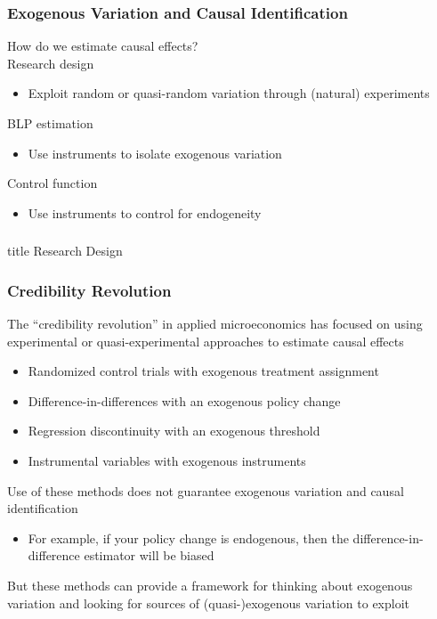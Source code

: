 \documentclass{beamer}
\begin{document}
\begin{frame}\frametitle{Exogenous Variation and Causal Identification}
    How do we estimate causal effects? \\
    \vspace{2ex}
    Research design
    \begin{itemize}
        \item Exploit random or quasi-random variation through (natural) experiments
    \end{itemize}
    \vspace{2ex}
    BLP estimation
    \begin{itemize}
        \item Use instruments to isolate exogenous variation
    \end{itemize}
    \vspace{2ex}
    Control function
    \begin{itemize}
        \item Use instruments to control for endogeneity
    \end{itemize}
\end{frame}

\begin{frame}\frametitle{}
    \vfill
    \centering
    \begin{beamercolorbox}[center]{title}
        \Large Research Design
    \end{beamercolorbox}
    \vfill
\end{frame}

\begin{frame}\frametitle{Credibility Revolution}
    The ``credibility revolution'' in applied microeconomics has focused on using experimental or quasi-experimental approaches to estimate causal effects
    \begin{itemize}
    	\item Randomized control trials with exogenous treatment assignment
    	\item Difference-in-differences with an exogenous policy change
    	\item Regression discontinuity with an exogenous threshold
    	\item Instrumental variables with exogenous instruments
    \end{itemize}
    \vspace{2ex}
    Use of these methods does not guarantee exogenous variation and causal identification
    \begin{itemize}
    	\item For example, if your policy change is endogenous, then the difference-in-difference estimator will be biased
    \end{itemize}
    \vspace{2ex}
    But these methods can provide a framework for thinking about exogenous variation and looking for sources of (quasi-)exogenous variation to exploit
\end{frame}
\end{document}

